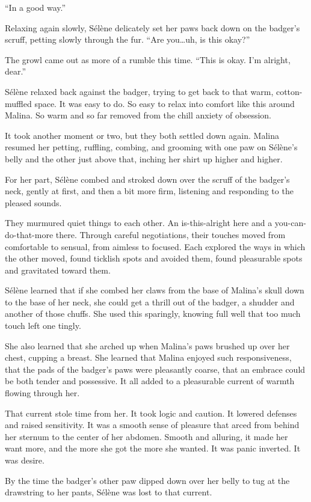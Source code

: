 ``In a good way.''

Relaxing again slowly, Sélène delicately set her paws back down on the badger's scruff, petting slowly through the fur. ``Are you\ldots{}uh, is this okay?''

The growl came out as more of a rumble this time. ``This is okay. I'm alright, dear.''

Sélène relaxed back against the badger, trying to get back to that warm, cotton-muffled space. It was easy to do. So easy to relax into comfort like this around Malina. So warm and so far removed from the chill anxiety of obsession.

It took another moment or two, but they both settled down again. Malina resumed her petting, ruffling, combing, and grooming with one paw on Sélène's belly and the other just above that, inching her shirt up higher and higher.

For her part, Sélène combed and stroked down over the scruff of the badger's neck, gently at first, and then a bit more firm, listening and responding to the pleased sounds.

They murmured quiet things to each other. An is-this-alright here and a you-can-do-that-more there. Through careful negotiations, their touches moved from comfortable to sensual, from aimless to focused. Each explored the ways in which the other moved, found ticklish spots and avoided them, found pleasurable spots and gravitated toward them.

Sélène learned that if she combed her claws from the base of Malina's skull down to the base of her neck, she could get a thrill out of the badger, a shudder and another of those chuffs. She used this sparingly, knowing full well that too much touch left one tingly.

She also learned that she arched up when Malina's paws brushed up over her chest, cupping a breast. She learned that Malina enjoyed such responsiveness, that the pads of the badger's paws were pleasantly coarse, that an embrace could be both tender and possessive. It all added to a pleasurable current of warmth flowing through her.

That current stole time from her. It took logic and caution. It lowered defenses and raised sensitivity. It was a smooth sense of pleasure that arced from behind her sternum to the center of her abdomen. Smooth and alluring, it made her want more, and the more she got the more she wanted. It was panic inverted. It was desire.

By the time the badger's other paw dipped down over her belly to tug at the drawstring to her pants, Sélène was lost to that current.

